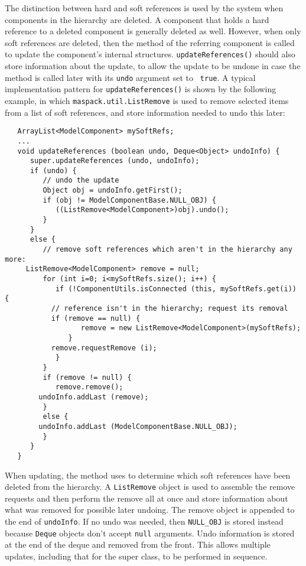 \documentclass{article}
\begin{document}
The distinction between hard and soft references is used by the system
when components in the hierarchy are deleted. A component that holds a
hard reference to a deleted component is generally deleted as well.
However, when only soft references are deleted, then the
 method of the
referring component is called to update the component's internal
structures. {\tt updateReferences()} should also store information
about the update, to allow the update to be undone in case the method
is called later with its {\tt undo} argument set to {\tt
true}. A typical implementation pattern for {\tt updateReferences()}
is shown by the following example, in which 
{\tt maspack.util.ListRemove} is used to remove selected items from a list
of soft references, and store information needed to undo this later:
\begin{lstlisting}
   ArrayList<ModelComponent> mySoftRefs;
   ...
   void updateReferences (boolean undo, Deque<Object> undoInfo) {
      super.updateReferences (undo, undoInfo); 
      if (undo) {
         // undo the update
         Object obj = undoInfo.getFirst();
         if (obj != ModelComponentBase.NULL_OBJ) {
            ((ListRemove<ModelComponent>)obj).undo();
         }
      }
      else {
         // remove soft references which aren't in the hierarchy any more:
	 ListRemove<ModelComponent> remove = null;
         for (int i=0; i<mySoftRefs.size(); i++) {
            if (!ComponentUtils.isConnected (this, mySoftRefs.get(i)) {
	       // reference isn't in the hierarchy; request its removal
	       if (remove == null) {
                  remove = new ListRemove<ModelComponent>(mySoftRefs);
               }
	       remove.requestRemove (i);
            }
         }
         if (remove != null) {
            remove.remove();
	    undoInfo.addLast (remove);
         }
         else {
	    undoInfo.addLast (ModelComponentBase.NULL_OBJ);
         }               
      }
   }
\end{lstlisting}
When updating, the method uses
 to determine which soft
references have been deleted from the hierarchy.  A {\tt ListRemove}
object is used to assemble the remove requests and then perform the
remove all at once and store information about what was removed for
possible later undoing. The remove object is appended to the end of
{\tt undoInfo}. If no undo was needed, then {\tt NULL\_OBJ} is stored
instead because {\tt Deque} objects don't accept {\tt null} arguments.
Undo information is stored at the end of the deque and removed from
the front. This allows multiple updates, including that
for the super class, to be performed in sequence.
\end{document}
